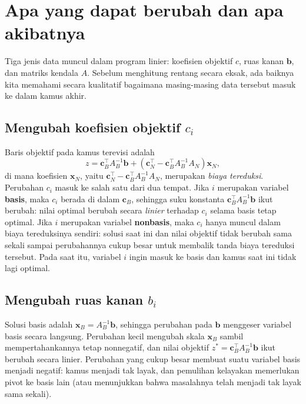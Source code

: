 \section{Apa yang dapat berubah dan apa akibatnya}
\label{sec:sensitivity-overview}

Tiga jenis data muncul dalam program linier: koefisien objektif \(c\), ruas kanan \(\mathbf{b}\), dan matriks kendala \(A\). Sebelum menghitung rentang secara eksak, ada baiknya kita memahami secara kualitatif bagaimana masing-masing data tersebut masuk ke dalam kamus akhir.

\subsection{Mengubah koefisien objektif \( c_i \)}

Baris objektif pada kamus terevisi adalah
\[
z = \mathbf{c}_B^\top A_B^{-1} \mathbf{b} + (\mathbf{c}_N^\top - \mathbf{c}_B^\top A_B^{-1} A_N) \mathbf{x}_N,
\]
di mana koefisien \( \mathbf{x}_N \), yaitu \( \mathbf{c}_N^\top - \mathbf{c}_B^\top A_B^{-1} A_N \), merupakan \emph{biaya tereduksi}. Perubahan \(c_i\) masuk ke salah satu dari dua tempat. Jika \(i\) merupakan variabel \textbf{basis}, maka \(c_i\) berada di dalam \(\mathbf{c}_B\), sehingga suku konstanta \(\mathbf{c}_B^\top A_B^{-1}\mathbf{b}\) ikut berubah: nilai optimal berubah secara \emph{linier} terhadap \(c_i\) selama basis tetap optimal. Jika \(i\) merupakan variabel \textbf{nonbasis}, maka \(c_i\) hanya muncul dalam biaya tereduksinya sendiri: solusi saat ini dan nilai objektif tidak berubah sama sekali sampai perubahannya cukup besar untuk membalik tanda biaya tereduksi tersebut. Pada saat itu, variabel \(i\) ingin masuk ke basis dan kamus saat ini tidak lagi optimal.

\subsection{Mengubah ruas kanan \( b_i \)}

Solusi basis adalah \( \mathbf{x}_B = A_B^{-1}\mathbf{b} \), sehingga perubahan pada \(\mathbf{b}\) menggeser variabel basis secara langsung. Perubahan kecil mengubah skala \(\mathbf{x}_B\) sambil mempertahankannya tetap nonnegatif, dan nilai objektif \( z^* = \mathbf{c}_B^\top A_B^{-1}\mathbf{b} \) ikut berubah secara linier. Perubahan yang cukup besar membuat suatu variabel basis menjadi negatif: kamus menjadi tak layak, dan pemulihan kelayakan memerlukan pivot ke basis lain (atau menunjukkan bahwa masalahnya telah menjadi tak layak sama sekali).


